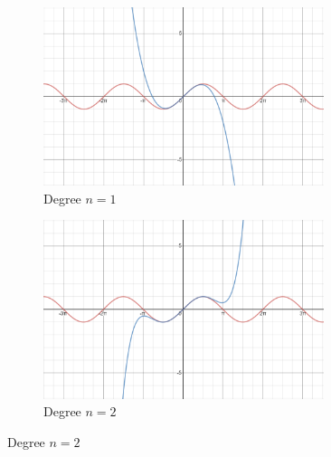 \documentclass[a4paper,11pt]{article}
\theoremstyle{plain}
\begin{document}
\begin{figure}[hbtp]
	\begin{subfigure}{0.5\textwidth}
		\centering
		\includegraphics[width=0.9\textwidth]{taylor1}
		\caption{Degree $n=1$}
	\end{subfigure}
	\begin{subfigure}{0.5\textwidth}
		\centering
		\includegraphics[width=0.9\textwidth]{taylor2}
		\caption{Degree $n=2$}
	\end{subfigure}


\end{figure}
\end{document}

